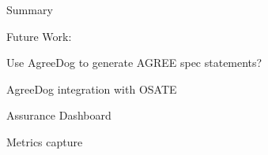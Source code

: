 Summary

Future Work:

Use AgreeDog to generate AGREE spec statements?

AgreeDog integration with OSATE

Assurance Dashboard

Metrics capture